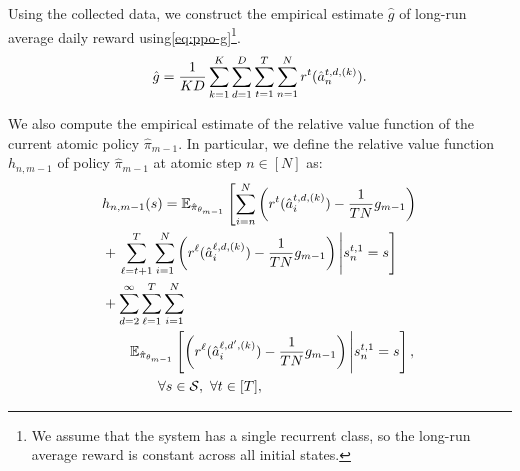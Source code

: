 Using the collected data, we construct the empirical estimate $\hat{g}$ of long-run average daily reward using\eqref{eq:ppo-g}\footnote{We assume that the system has a single recurrent class, so the long-run average reward is constant across all initial states.}.
\begin{equation} \label{eq:ppo-g}
    \hat{g} = \frac{1}{KD} \sum_{k = 1}^K \sum_{d = 1}^{D} \sum_{t = 1}^{T} \sum_{n = 1}^{N} r^t(\hat{a}^{t,d,(k)}_n).
\end{equation}

We also compute the empirical estimate of the relative value function of the current atomic policy $\hat{\pi}_{m-1}$. In particular, we define the relative value function $h_{n, m-1}$ of policy $\hat{\pi}_{m-1}$ at atomic step $n \in [N]$ as:
\begin{align} \label{eq:ppo-v-def}
    &h_{n, m-1}(s) = \mathbb{E}_{\hat{\pi}_{\theta_{m-1}}}\left[\sum_{i = n}^{N} \left(r^t(\hat{a}^{t,d, (k)}_{i}) - \frac{1}{TN}g_{m-1}\right) \right. \notag \\
    &+ \left. \sum_{\ell = t + 1}^{\Horizon} \sum_{i = 1}^{N} \left( r^{\ell}(\hat{a}^{\ell,d, (k)}_{i}) - \frac{1}{TN}g_{m-1} \right) \Bigg\lvert s^{t,1}_n = s \right] \notag \\
    &+ \sum_{d = 2}^{\infty} \sum_{\ell = 1}^{\Horizon} \sum_{i = 1}^{N} \notag\\
    &\qquad \mathbb{E}_{\hat{\pi}_{\theta_{m-1}}}\left[ \left( r^{\ell}(\hat{a}^{\ell,d', (k)}_{i}) - \frac{1}{TN}g_{m-1} \right) \Bigg\lvert s^{t,1}_n = s \right], \notag\\ 
    &\qquad\qquad \forall s \in \mathcal{S},\  \forall t \in [\Horizon],%
\end{align}
